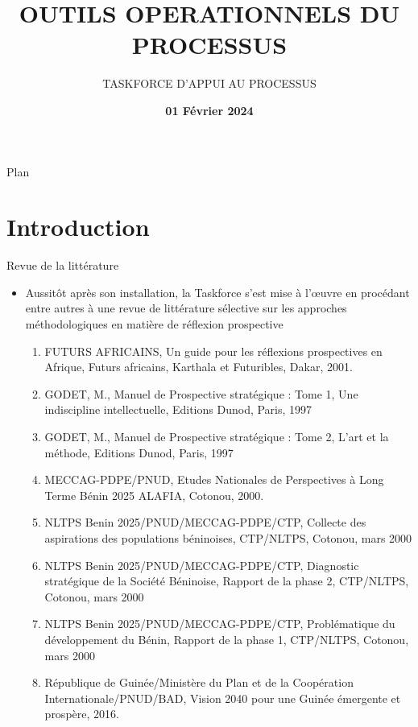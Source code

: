 \documentclass[11pt]{beamer}
\author [TASKFORCE]{\alert{TASKFORCE D'APPUI AU PROCESSUS }\inst{}}
\title[NLTPS 2060]{\large{\textbf{OUTILS OPERATIONNELS DU PROCESSUS}   }}
\date[ ]{\textbf{01 Février 2024}}
\begin{document}
 

\begin{frame}
\titlepage
\end{frame}
 
\begin{frame}{Plan}
\tableofcontents    %
\end{frame}

\section{Introduction}

\begin{frame}{Revue de la littérature}
\begin{itemize} [<+->]
\item  \small Aussitôt après son installation, la Taskforce s’est mise à l’œuvre en procédant entre autres à une revue de littérature sélective sur les approches méthodologiques en matière de réflexion prospective  \vfill 
\begin{enumerate} [<+->]
   \item  \tiny FUTURS AFRICAINS, Un guide pour les réflexions prospectives en Afrique, Futurs africains, Karthala et Futuribles, Dakar, 2001. \vfill
   \item \tiny GODET, M., Manuel de Prospective stratégique : Tome 1, Une indiscipline intellectuelle, Editions Dunod, Paris, 1997 \vfill
   \item  \tiny GODET, M., Manuel de Prospective stratégique : Tome 2, L’art et la méthode, Editions Dunod, Paris, 1997  \vfill
   \item  \tiny MECCAG-PDPE/PNUD, Etudes Nationales de Perspectives à Long Terme Bénin 2025 ALAFIA, Cotonou, 2000. \vfill
   \item \tiny NLTPS Benin 2025/PNUD/MECCAG-PDPE/CTP, Collecte des aspirations des populations béninoises, CTP/NLTPS, Cotonou, mars 2000 \vfill
   \item  \tiny NLTPS Benin 2025/PNUD/MECCAG-PDPE/CTP, Diagnostic stratégique de la Société Béninoise, Rapport de la phase 2, CTP/NLTPS, Cotonou, mars 2000 \vfill
  \item   \tiny NLTPS Benin 2025/PNUD/MECCAG-PDPE/CTP, Problématique du développement du Bénin, Rapport de la phase 1, CTP/NLTPS, Cotonou, mars 2000 \vfill
  \item   \tiny République de Guinée/Ministère du Plan et de la Coopération Internationale/PNUD/BAD, Vision 2040 pour une Guinée émergente et prospère, 2016. \vfill
\end{enumerate}
\end{itemize}
\end{frame}
\end{document}
